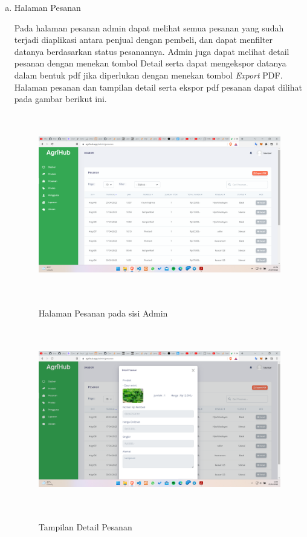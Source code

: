 \begin{enumerate}
\begin{enumerate}[a.]
		\item Halaman Pesanan
		\par Pada halaman pesanan admin dapat melihat semua pesanan yang sudah terjadi diaplikasi antara penjual dengan pembeli, dan dapat menfilter datanya berdasarkan status pesanannya. Admin juga dapat melihat detail pesanan dengan menekan tombol Detail serta dapat mengekspor datanya dalam bentuk pdf jika diperlukan dengan menekan tombol \textit{Export} PDF. Halaman pesanan dan tampilan detail serta ekspor pdf pesanan dapat dilihat pada gambar berikut ini.
		\begin{figure}[H]
			\centering
			{\includegraphics [width = 13.3cm, height= 8cm]{gambar/admin/pesanan_admin}}
			\caption{Halaman Pesanan pada sisi Admin}
			\label{pesanan_admin}
		\end{figure}
		\begin{figure}[H]
			\centering
			{\includegraphics [width = 13.3cm, height= 8cm]{gambar/admin/detail_pesanan}}
			\caption{Tampilan Detail Pesanan}
			\label{detail_pesanan}
		\end{figure}

\end{enumerate}
\end{enumerate}
